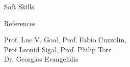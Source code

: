 \documentclass{resume_short} %
\begin{document}
\begin{paracol}{2}
\begin{rSection}{Soft Skills}{}
  \end{rSection}

\vspace{1.1mm}
\begin{rSection}{References}{} 
\begin{sSubsection}{Prof. Luc V. Gool, Prof. Fabio Cuzzolin, \\Prof Leonid Sigal, Prof. Philip Torr \\ Dr. Georgios Evangelidis}\end{sSubsection}
    

\end{rSection}
\end{paracol}
\end{document}
